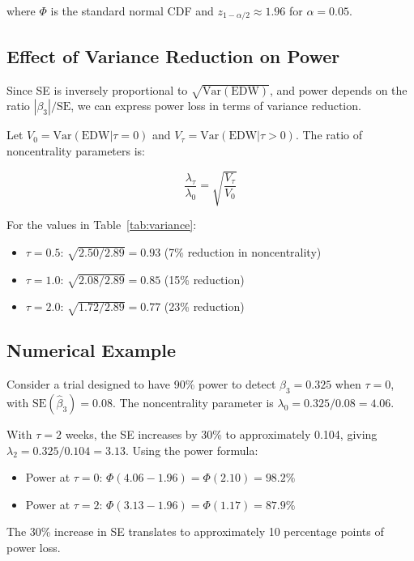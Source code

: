 \documentclass[11pt,letterpaper]{article}
\begin{document}
where $\Phi$ is the standard normal CDF and $z_{1-\alpha/2} \approx 1.96$ for
$\alpha = 0.05$.

\subsection{Effect of Variance Reduction on Power}

Since SE is inversely proportional to $\sqrt{\text{Var}(\text{EDW})}$, and
power depends on the ratio $|\beta_3|/\text{SE}$, we can express power loss
in terms of variance reduction.

Let $V_0 = \text{Var}(\text{EDW}|\tau=0)$ and $V_\tau =
\text{Var}(\text{EDW}|\tau>0)$. The ratio of noncentrality parameters is:

\begin{equation}
\frac{\lambda_\tau}{\lambda_0} = \sqrt{\frac{V_\tau}{V_0}}
\end{equation}

For the values in Table~\ref{tab:variance}:
\begin{itemize}
    \item $\tau = 0.5$: $\sqrt{2.50/2.89} = 0.93$ (7\% reduction in
          noncentrality)
    \item $\tau = 1.0$: $\sqrt{2.08/2.89} = 0.85$ (15\% reduction)
    \item $\tau = 2.0$: $\sqrt{1.72/2.89} = 0.77$ (23\% reduction)
\end{itemize}

\subsection{Numerical Example}

Consider a trial designed to have 90\% power to detect $\beta_3 = 0.325$ when
$\tau = 0$, with $\text{SE}(\hat{\beta}_3) = 0.08$. The noncentrality
parameter is $\lambda_0 = 0.325/0.08 = 4.06$.

With $\tau = 2$ weeks, the SE increases by 30\% to approximately 0.104,
giving $\lambda_{2} = 0.325/0.104 = 3.13$. Using the power formula:

\begin{itemize}
    \item Power at $\tau = 0$: $\Phi(4.06 - 1.96) = \Phi(2.10) = 98.2\%$
    \item Power at $\tau = 2$: $\Phi(3.13 - 1.96) = \Phi(1.17) = 87.9\%$
\end{itemize}

The 30\% increase in SE translates to approximately 10 percentage points of
power loss.
\end{document}
